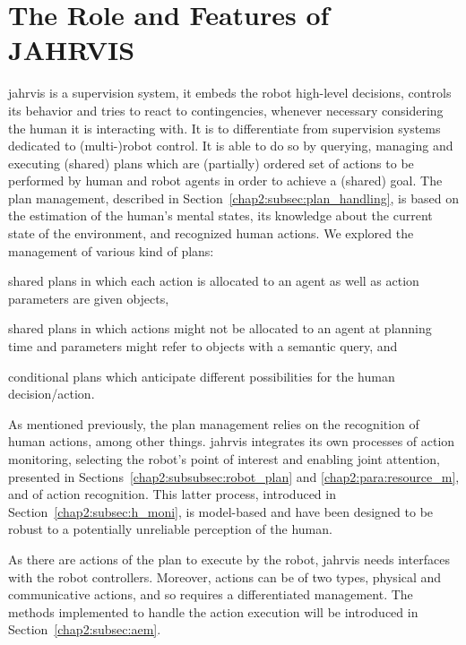 \documentclass[a4paper,11pt,twoside]{StyleThese}
\begin{document}
\section{The Role and Features of JAHRVIS}\label{chap2:sec:sup_features}

\acrshort{jahrvis} is a supervision system, \ie it embeds the robot high-level decisions, controls its behavior and tries to react to contingencies, whenever necessary considering the human it is interacting with. It is to differentiate from supervision systems dedicated to (multi-)robot control. It is able to do so by querying, managing and executing (shared) plans which are (partially) ordered set of actions to be performed by human and robot agents in order to achieve a (shared) goal. The plan management, described in Section~\ref{chap2:subsec:plan_handling}, is based on the estimation of the human's mental states, its knowledge about the current state of the environment, and recognized human actions. We explored the management of various kind of plans: 
\begin{inlineEnumerate}
	\item shared plans in which each action is allocated to an agent as well as action parameters are given objects,
	\item shared plans in which actions might not be allocated to an agent at planning time and parameters might refer to objects with a semantic query, and
	\item conditional plans which anticipate different possibilities for the human decision/action. 
\end{inlineEnumerate} 

As mentioned previously, the plan management relies on the recognition of human actions, among other things. \acrshort{jahrvis} integrates its own processes of action monitoring, \ie selecting the robot's point of interest and enabling joint attention, presented in Sections~\ref{chap2:subsubsec:robot_plan} and \ref{chap2:para:resource_m}, and of action recognition. This latter process, introduced in Section~\ref{chap2:subsec:h_moni}, is model-based and have been designed to be robust to a potentially unreliable perception of the human.

As there are actions of the plan to execute by the robot, \acrshort{jahrvis} needs interfaces with the robot controllers. Moreover, actions can be of two types, physical and communicative actions, and so requires a differentiated management. The methods implemented to handle the action execution will be introduced in Section~\ref{chap2:subsec:aem}.
\end{document}
